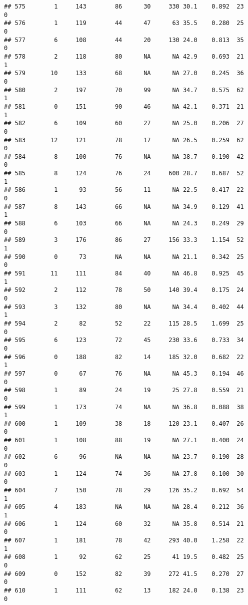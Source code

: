 \documentclass[
]{article}
\begin{document}
\begin{verbatim}
## 575        1     143        86      30     330 30.1    0.892  23    0
## 576        1     119        44      47      63 35.5    0.280  25    0
## 577        6     108        44      20     130 24.0    0.813  35    0
## 578        2     118        80      NA      NA 42.9    0.693  21    1
## 579       10     133        68      NA      NA 27.0    0.245  36    0
## 580        2     197        70      99      NA 34.7    0.575  62    1
## 581        0     151        90      46      NA 42.1    0.371  21    1
## 582        6     109        60      27      NA 25.0    0.206  27    0
## 583       12     121        78      17      NA 26.5    0.259  62    0
## 584        8     100        76      NA      NA 38.7    0.190  42    0
## 585        8     124        76      24     600 28.7    0.687  52    1
## 586        1      93        56      11      NA 22.5    0.417  22    0
## 587        8     143        66      NA      NA 34.9    0.129  41    1
## 588        6     103        66      NA      NA 24.3    0.249  29    0
## 589        3     176        86      27     156 33.3    1.154  52    1
## 590        0      73        NA      NA      NA 21.1    0.342  25    0
## 591       11     111        84      40      NA 46.8    0.925  45    1
## 592        2     112        78      50     140 39.4    0.175  24    0
## 593        3     132        80      NA      NA 34.4    0.402  44    1
## 594        2      82        52      22     115 28.5    1.699  25    0
## 595        6     123        72      45     230 33.6    0.733  34    0
## 596        0     188        82      14     185 32.0    0.682  22    1
## 597        0      67        76      NA      NA 45.3    0.194  46    0
## 598        1      89        24      19      25 27.8    0.559  21    0
## 599        1     173        74      NA      NA 36.8    0.088  38    1
## 600        1     109        38      18     120 23.1    0.407  26    0
## 601        1     108        88      19      NA 27.1    0.400  24    0
## 602        6      96        NA      NA      NA 23.7    0.190  28    0
## 603        1     124        74      36      NA 27.8    0.100  30    0
## 604        7     150        78      29     126 35.2    0.692  54    1
## 605        4     183        NA      NA      NA 28.4    0.212  36    1
## 606        1     124        60      32      NA 35.8    0.514  21    0
## 607        1     181        78      42     293 40.0    1.258  22    1
## 608        1      92        62      25      41 19.5    0.482  25    0
## 609        0     152        82      39     272 41.5    0.270  27    0
## 610        1     111        62      13     182 24.0    0.138  23    0

\end{verbatim}
\end{document}

